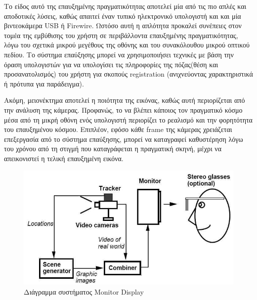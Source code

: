 Το είδος αυτό της επαυξημένης πραγματικότητας αποτελεί μία από τις πιο απλές και αποδοτικές λύσεις, καθώς απαιτεί έναν τυπικό ηλεκτρονικό υπολογιστή και  και μία βιντεοκάμερα USB ή Firewire. Ωστόσο αυτή η απλότητα προκαλεί συνέπειες στον τομέα της εμβύθισης του χρήστη σε περιβάλλοντα επαυξημένης πραγματικότητας, λόγω του σχετικά μικρού μεγέθους της οθόνης και του συνακόλουθου μικρού οπτικού πεδίου. Το σύστημα επαύξησης μπορεί να χρησιμοποιήσει τεχνικές με βάση την όραση υπολογιστών για να υπολογίσει τις πληροφορίες της πόζας(θέση και προσανατολισμός) του χρήστη για σκοπούς registration (ανιχνεύοντας χαρακτηριστικά ή πρότυπα για παράδειγμα).

Ακόμη, μειονέκτημα αποτελεί η ποιότητα της εικόνας, καθώς αυτή περιορίζεται από την ανάλυση της κάμερας. Προφανώς, το να βλέπει κάποιος τον πραγματικό κόσμο μέσα από τη μικρή οθόνη ενός υπολογιστή περιορίζει το ρεαλισμό και την φορητότητα του επαυξημένου κόσμου. Επιπλέον, εφόσο κάθε frame της κάμερας χρειάζεται επεξεργασία από το σύστημα επαύξησης, μπορεί να καταγραφεί καθυστέρηση λόγω του χρόνου από τη στιγμή που καταγράφεται η πραγματική σκηνή, μέχρι να απεικονιστεί η τελική επαυξημένη εικόνα. 




\begin{figure}[H]
    \centering
    \includegraphics[scale=0.8, angle=0]{Files/Figures/monitor.jpg}
    \caption[Διάγραμμα συστήματος Monitor Display \cite{azuma1997}]{ Διάγραμμα συστήματος Monitor Display \cite{azuma1997}}
    \label{fig:monitor}
\end{figure}


